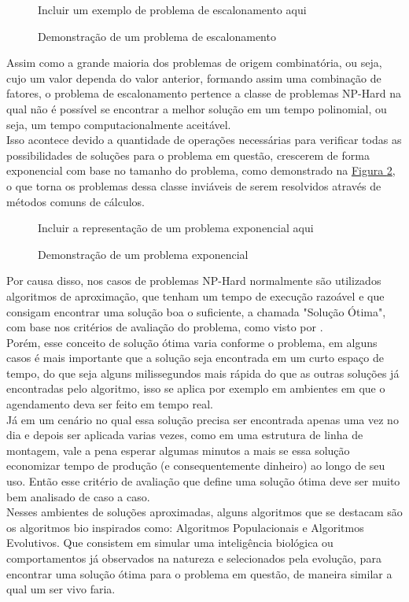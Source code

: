 \begin{figure}[ht]
    \centering
    \caption{Demonstração de um problema de escalonamento}
    \label{fig:ex-problema-escalonamento}
    \small{Incluir um exemplo de problema de escalonamento aqui}
\end{figure}

Assim como a grande maioria dos problemas de origem combinatória, ou seja, cujo um valor dependa do valor anterior, formando assim uma combinação de fatores, o problema de escalonamento pertence a classe de problemas NP-Hard na qual não é possível se encontrar a melhor solução em um tempo polinomial, ou seja, um tempo computacionalmente aceitável.\\
\indent Isso acontece devido a quantidade de operações necessárias para verificar todas as possibilidades de soluções para o problema em questão, crescerem de forma exponencial com base no tamanho do problema, 
como demonstrado na \hyperref[fig:problema-exponencial]{Figura \ref{fig:problema-exponencial}},
o que torna os problemas dessa classe inviáveis de serem resolvidos através de métodos comuns de cálculos.\hfill

\begin{figure}[h]
    \centering
    \small{Incluir a representação de um problema exponencial aqui}
    \caption{Demonstração de um problema exponencial}
    \label{fig:problema-exponencial}
\end{figure}

Por causa disso, nos casos de problemas NP-Hard normalmente são utilizados algoritmos de aproximação, que tenham um tempo de execução razoável e que consigam encontrar uma solução boa o suficiente, a chamada "Solução Ótima",  com base nos critérios de avaliação do problema, como visto por \cite{lawler1993}.\\
Porém, esse conceito de solução ótima varia conforme o problema, em alguns casos é mais importante que a solução seja encontrada em um curto espaço de tempo, do que seja alguns milissegundos mais rápida do que as outras soluções já encontradas pelo algoritmo, isso se aplica por exemplo em ambientes em que o agendamento deva ser feito em tempo real.\\
\indent Já em um cenário no qual essa solução precisa ser encontrada apenas uma vez no dia e depois ser aplicada varias vezes, como em uma estrutura de linha de montagem, vale a pena esperar algumas minutos a mais se essa solução economizar tempo de produção (e consequentemente dinheiro) ao longo de seu uso. Então esse critério de avaliação que define uma solução ótima deve ser muito bem analisado de caso a caso.\\
\indent Nesses ambientes de soluções aproximadas, alguns algoritmos que se destacam são os algoritmos bio inspirados como: Algoritmos Populacionais e Algoritmos Evolutivos. 
Que consistem em simular uma inteligência biológica ou comportamentos já observados na natureza e selecionados pela evolução, para encontrar uma solução ótima para o problema em questão, de maneira similar a qual um ser vivo faria.\\


